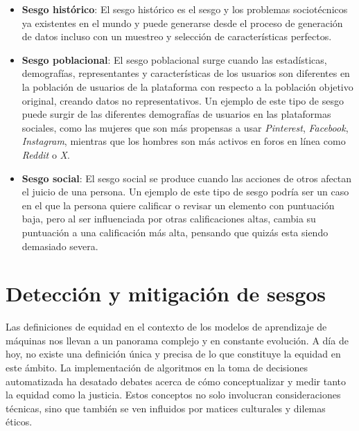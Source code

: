     \begin{itemize}
        \item \textbf{Sesgo hist\'orico}: El sesgo hist\'orico es el sesgo y los problemas sociot\'ecnicos ya existentes en el mundo y puede 
        generarse desde el proceso de generaci\'on de datos incluso con un muestreo y selecci\'on de caracter\'isticas perfectos.

        \item \textbf{Sesgo poblacional}: El sesgo poblacional surge cuando las estad\'isticas, demograf\'ias, representantes y caracter\'isticas 
        de los usuarios son diferentes en la poblaci\'on de usuarios de la plataforma con respecto a la poblaci\'on objetivo original, creando datos no
        representativos. Un ejemplo de este tipo de sesgo puede surgir de las diferentes demograf\'ias de usuarios en las plataformas sociales, como las
        mujeres que son m\'as propensas a usar \textit{Pinterest}, \textit{Facebook}, \textit{Instagram}, mientras que los hombres son m\'as activos en 
        foros en l\'inea como \textit{Reddit} o \textit{X}.

        \item \textbf{Sesgo social}: El sesgo social se produce cuando las acciones de otros afectan el juicio de una persona. Un ejemplo de este tipo de 
        sesgo podr\'ia ser un caso en el que la persona quiere calificar o revisar un elemento con puntuaci\'on baja, pero al ser influenciada por otras
        calificaciones altas, cambia su puntuaci\'on a una calificaci\'on m\'as alta, pensando que quiz\'as esta siendo demasiado severa.
    \end{itemize}

\section{Detecci\'on y mitigaci\'on de sesgos}

Las definiciones de equidad en el contexto de los modelos de aprendizaje de m\'aquinas nos llevan 
a un panorama complejo y en constante evoluci\'on. A d\'ia de hoy, no existe una definici\'on \'unica y precisa
de lo que constituye la equidad en este \'ambito. La implementaci\'on de algoritmos en la toma de decisiones automatizada ha desatado 
debates acerca de c\'omo conceptualizar y medir tanto la equidad como la justicia. Estos conceptos no solo involucran consideraciones 
t\'ecnicas, sino que tambi\'en se ven influidos por matices culturales y dilemas \'eticos.

